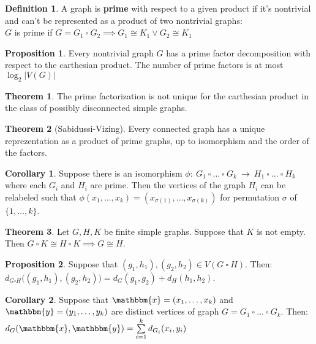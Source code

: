 \documentclass{article}
\theoremstyle{definition}
\newtheorem{theorem}{Theorem}[section]
\newtheorem{corollary}{Corollary}[section]
\newtheorem{prop}{Proposition}[section]
\newtheorem{dd}{Definition}[section]
\begin{document}
\begin{dd}
    A graph is \textbf{prime} with respect to a given product if it's nontrivial and can't be represented as a product of two nontrivial graphs: \\
    $G$ is prime if $G = G_1\ \square\ G_2 \implies G_1 \cong K_1 \lor G_2 \cong K_1$
\end{dd}

\begin{prop}
    Every nontrivial graph $G$ has a prime factor decomposition with respect to the carthesian product. The number of prime factors is at most $\log_2|V(G)|$
\end{prop}

\begin{theorem}
    The prime factorization is not unique for the carthesian product in the class of possibly disconnected simple graphs.
\end{theorem}

\begin{theorem}[Sabidussi-Vizing]
    Every connected graph has a unique reprezentation as a product of prime graphs, up to isomorphism and the order of the factors.
\end{theorem}

\begin{corollary}
    Suppose there is an isomorphism $\phi:\ G_1\ \square\ \dots\ \square\ G_k\ \to\ H_1\ \square\ \dots\ \square\ H_k$ where each $G_i$ and $H_i$ are prime. Then the vertices of the graph $H_i$ can be relabeled such that $\phi(x_1, \dots, x_k) = (x_{\sigma(1)}, \dots, x_{\sigma(k)})$ for permutation $\sigma$ of $\{1, \dots, k\}$.
\end{corollary}

\begin{theorem}
    Let $G, H, K$ be finite simple graphs. Suppose that $K$ is not empty. Then $G\ \square\ K \cong H\ \square\ K \implies G \cong H$.
\end{theorem}

\begin{prop}
    Suppose that $(g_1, h_1), (g_2, h_2) \in V(G\ \square\ H)$. Then: \\
    $d_{G \square H}\bigl((g_1, h_1), (g_2, h_2)\bigr) = d_G(g_1, g_2) + d_H(h_1, h_2)$.
\end{prop}

\begin{corollary}
    Suppose that $\mathbbm{x} = (x_1, \dots, x_k)$ and $\mathbbm{y} = (y_1, \dots, y_k)$ are distinct vertices of graph $G = G_1\ \square\ \dots\ \square\ G_k$. Then: \\
    $d_G(\mathbbm{x}, \mathbbm{y}) = \sum\limits_{i = 1}^k d_{G_i}(x_i, y_i)$
\end{corollary}
\end{document}
